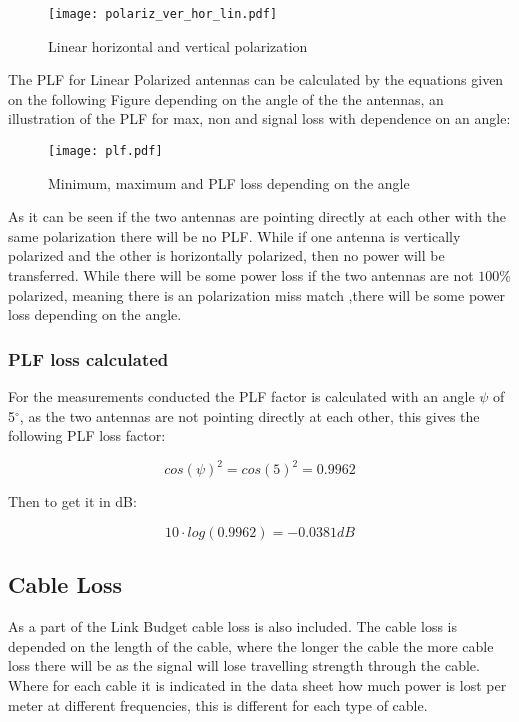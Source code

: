 \begin{figure}[H]
\centering
\texttt{[image: polariz\_ver\_hor\_lin.pdf]}
\caption{Linear horizontal and vertical polarization}
\label{fig:pol_ver_hor}
\end{figure} 

The PLF for Linear Polarized antennas can be calculated by the equations given on the following Figure depending on the angle of the the antennas, an illustration of the PLF for max, non and signal loss with dependence on an angle:

\begin{figure}[H]
\centering
\texttt{[image: plf.pdf]}
\caption{Minimum, maximum and PLF loss depending on the angle}
\label{fig:lin_plf}
\end{figure} 

As it can be seen if the two antennas are pointing directly at each other with the same polarization there will be no PLF. While if one antenna is vertically polarized and the other is horizontally polarized, then no power will be transferred. While there will be some power loss if the two antennas are not $100\%$ polarized, meaning there is an polarization miss match ,there will be some power loss depending on the angle.

\subsubsection{PLF loss calculated}

For the measurements conducted the PLF factor is calculated with an angle $\psi$ of 5$^{\circ}$, as the two antennas are not pointing directly at each other, this gives the following PLF loss factor:

\begin{equation}
cos(\psi)^{2} = cos(5)^2 = 0.9962
\end{equation}

Then to get it in dB:

\begin{equation}
10 \cdot log(0.9962) = -0.0381dB
\end{equation}





\subsection{Cable Loss}
As a part of the Link Budget cable loss is also included. The cable loss is depended on the length of the cable, where the longer the cable the more cable loss there will be as the signal will lose travelling strength through the cable. Where for each cable it is indicated in the data sheet how much power is lost per meter at different frequencies, this is different for each type of cable. 


